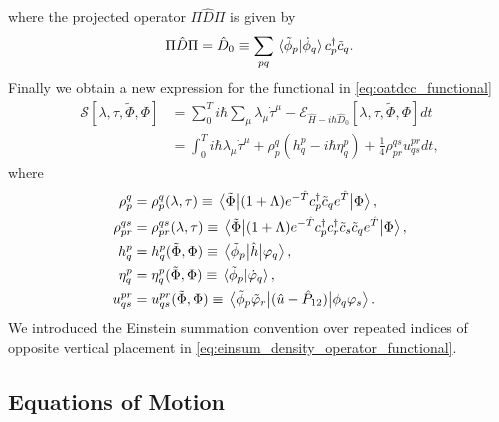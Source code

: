 where the projected operator $\Pi\hat{D}\Pi$ is given by 
\begin{equation}
    \Pi\hat{D}\Pi = \hat{D}_0 
    \equiv 
    \sum_{pq}\braket*{\tilde{\phi}_p}{\dot{\phi}_q}c^\dagger_p \tilde{c}_q.
\end{equation}
Finally we obtain a new expression for the functional in \autoref{eq:oatdcc_functional}
\begin{align}
    \label{eq:oatdcc_functional_final}
    \mathcal{S}[\lambda, \tau, \tilde{\Phi}, \Phi] 
    &= \sum_0^T 
    i\hbar\sum_\mu \lambda_\mu \dot{\tau}^\mu 
    - \mathcal{E}_{\hat{H} - i \hbar\hat{D}_0}[\lambda, \tau, \tilde{\Phi}, \Phi] dt \\
    \label{eq:einsum_density_operator_functional}  
    &= \int_0^T i\hbar \lambda_\mu \dot{\tau}^\mu 
    + \rho^q_p (h^p_q - i\hbar\eta^p_q) + \frac{1}{4}\rho^{qs}_{pr} u^{pr}_{qs}dt,
\end{align}
where
\begin{align} 
    \rho^q_p &= \rho^q_p(\lambda, \tau) 
    \equiv \mel{\tilde{\Phi}}
    {(1 + \Lambda)e^{-\hat{T}}c^\dagger_p \tilde{c}_q e^{\hat{T}}}
    {\Phi}, \\
    \rho^{qs}_{pr} &= \rho^{qs}_{pr}(\lambda, \tau) 
    \equiv \mel{\tilde{\Phi}}
    {(1 + \Lambda)e^{-\hat{T}} c^\dagger_p c^\dagger_r \tilde{c}_s \tilde{c}_q e^{\hat{T}}}
    {\Phi}, \\
    h^p_q &= h^p_q(\tilde{\Phi}, \Phi)
    \equiv \mel{\tilde{\phi}_p}{\hat{h}}{\varphi_q}, \\
    \eta^p_q &= \eta^p_q(\tilde{\Phi}, \Phi)
    \equiv \braket*{\tilde{\phi}_p}{\dot{\varphi}_q}, \\
    u^{pr}_{qs} &= u^{pr}_{qs}(\tilde{\Phi}, \Phi)
    \equiv \mel{\tilde{\phi}_p\tilde{\varphi}_r}
    {(\hat{u} - \hat{P}_{12})}
    {\phi_q \varphi_s}.
\end{align}
We introduced the Einstein summation convention over repeated indices of opposite vertical 
placement in \autoref{eq:einsum_density_operator_functional}.

\subsection{Equations of Motion}

